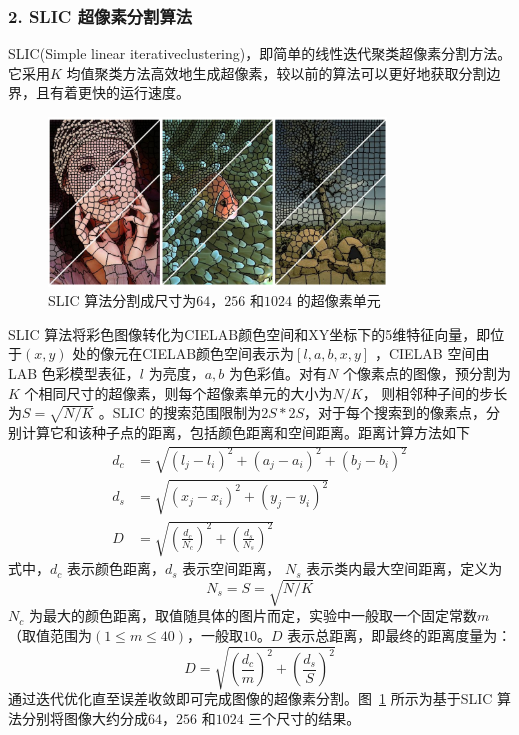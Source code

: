 \subsubsection*{2. SLIC 超像素分割算法}
\label{subsubsec:chap02-1-1-1}
SLIC(Simple linear iterativeclustering)，即简单的线性迭代聚类超像素分割方法。它采用$K$ 均值聚类方法高效地生成超像素，较以前的算法可以更好地获取分割边界，且有着更快的运行速度。

\begin{figure}[htb]
  \centering
  \includegraphics[width=0.8\textwidth]{figures/slic}
  \caption{SLIC 算法分割成尺寸为$64$，$256$ 和$1024$ 的超像素单元}\label{fig:slic}
\end{figure}

SLIC 算法将彩色图像转化为CIELAB颜色空间和XY坐标下的5维特征向量，即位于$(x,y)$ 处的像元在CIELAB颜色空间表示为$[l,a,b,x,y]$ ，CIELAB 空间由LAB 色彩模型表征，$l$ 为亮度，$a,b$ 为色彩值。对有$N$ 个像素点的图像，预分割为$K$ 个相同尺寸的超像素，则每个超像素单元的大小为$N/ K$， 则相邻种子间的步长为$S = \sqrt{N/K}$ 。SLIC 的搜索范围限制为$2S*2S$，对于每个搜索到的像素点，分别计算它和该种子点的距离，包括颜色距离和空间距离。距离计算方法如下
\begin{equation}
  \label{eq:2-5}
  \begin{split}
    d_c &= \sqrt{(l_j-l_i)^2 + (a_j-a_i)^2 + (b_j - b_i)^2} \\
    d_s &= \sqrt{(x_j-x_i)^2 + (y_j-y_i)^2} \\
    D &= \sqrt{(\frac{d_c}{N_c})^2 + (\frac{d_s}{N_s})^2}
  \end{split}
\end{equation}
式中，$d_c$ 表示颜色距离，$d_s$ 表示空间距离， $N_s$ 表示类内最大空间距离，定义为
\begin{equation}
  \label{eq:2-6}
  N_s = S = \sqrt{N/K}
\end{equation}
$N_c$ 为最大的颜色距离，取值随具体的图片而定，实验中一般取一个固定常数$m$ （取值范围为$(1\leq m \leq 40)$，一般取$10$。$D$ 表示总距离，即最终的距离度量为：
\begin{equation}
  \label{eq:2-7}
  D = \sqrt{(\frac{d_c}{m})^2 + (\frac{d_s}{S})^2}
\end{equation}
通过迭代优化直至误差收敛即可完成图像的超像素分割。图~\ref{fig:slic} 所示为基于SLIC 算法分别将图像大约分成$64$，$256$ 和$1024$ 三个尺寸的结果。



